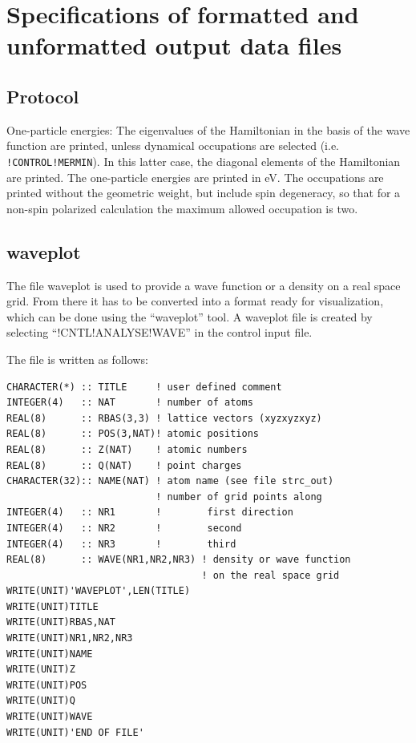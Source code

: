 \documentclass[final,12pt,makeidx,DIV=calc]{article}
\begin{document}
{{{%
\newpage
\section{Specifications of formatted and unformatted output data files}
\subsection{Protocol}
One-particle energies: The eigenvalues of the Hamiltonian in the basis
of the wave function are printed, unless dynamical occupations are
selected (i.e. \texttt{!CONTROL!MERMIN}). In this latter case, the
diagonal elements of the Hamiltonian are printed. The one-particle
energies are printed in eV. The occupations are printed without the
geometric weight, but include spin degeneracy, so that for a non-spin
polarized calculation the maximum allowed occupation is two.



\subsection{waveplot}
The file waveplot is used to provide a wave function or a density on
a real space grid. From there it has to be converted into a format
ready for visualization, which can be done using the ``waveplot'' tool.
A waveplot file is created by selecting ``!CNTL!ANALYSE!WAVE'' in the
control input file.


The file is written as follows:
\small{
\begin{verbatim}
CHARACTER(*) :: TITLE     ! user defined comment
INTEGER(4)   :: NAT       ! number of atoms
REAL(8)      :: RBAS(3,3) ! lattice vectors (xyzxyzxyz)
REAL(8)      :: POS(3,NAT)! atomic positions
REAL(8)      :: Z(NAT)    ! atomic numbers 
REAL(8)      :: Q(NAT)    ! point charges
CHARACTER(32):: NAME(NAT) ! atom name (see file strc_out)
                          ! number of grid points along 
INTEGER(4)   :: NR1       !        first direction
INTEGER(4)   :: NR2       !        second
INTEGER(4)   :: NR3       !        third
REAL(8)      :: WAVE(NR1,NR2,NR3) ! density or wave function 
                                  ! on the real space grid
WRITE(UNIT)'WAVEPLOT',LEN(TITLE)
WRITE(UNIT)TITLE
WRITE(UNIT)RBAS,NAT
WRITE(UNIT)NR1,NR2,NR3
WRITE(UNIT)NAME
WRITE(UNIT)Z
WRITE(UNIT)POS
WRITE(UNIT)Q
WRITE(UNIT)WAVE
WRITE(UNIT)'END OF FILE'
\end{verbatim}
}

}}}
\end{document}
